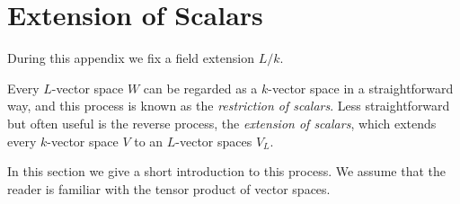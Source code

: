 \section{Extension of Scalars}
\label{appendix: extension of scalars}


\begin{conventions}
  During this appendix we fix a field extension $L/k$.
\end{conventions}


\begin{fluff}
  Every $L$-vector space $W$ can be regarded as a $k$-vector space in a straightforward way, and this process is known as the \emph{restriction of scalars}.
  Less straightforward but often useful is the reverse process, the \emph{extension of scalars}, which extends every $k$-vector space $V$ to an $L$-vector spaces $V_L$.
  
  In this section we give a short introduction to this process.
  We assume that the reader is familiar with the tensor product of vector spaces.
\end{fluff}









